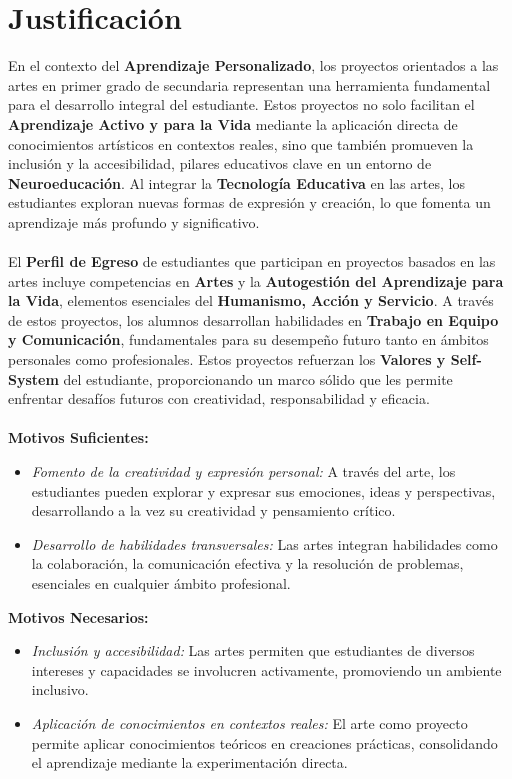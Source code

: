 \section{Justificación}
En el contexto del \textbf{Aprendizaje Personalizado}, los proyectos orientados a las artes en primer grado de secundaria representan una herramienta fundamental para el desarrollo integral del estudiante. Estos proyectos no solo facilitan el \textbf{Aprendizaje Activo y para la Vida} mediante la aplicación directa de conocimientos artísticos en contextos reales, sino que también promueven la inclusión y la accesibilidad, pilares educativos clave en un entorno de \textbf{Neuroeducación}. Al integrar la \textbf{Tecnología Educativa} en las artes, los estudiantes exploran nuevas formas de expresión y creación, lo que fomenta un aprendizaje más profundo y significativo.
\\ \\ 
El \textbf{Perfil de Egreso} de estudiantes que participan en proyectos basados en las artes incluye competencias en \textbf{Artes} y la \textbf{Autogestión del Aprendizaje para la Vida}, elementos esenciales del \textbf{Humanismo, Acción y Servicio}. A través de estos proyectos, los alumnos desarrollan habilidades en \textbf{Trabajo en Equipo y Comunicación}, fundamentales para su desempeño futuro tanto en ámbitos personales como profesionales. Estos proyectos refuerzan los \textbf{Valores y Self-System} del estudiante, proporcionando un marco sólido que les permite enfrentar desafíos futuros con creatividad, responsabilidad y eficacia.
\\ \\ 
\textbf{Motivos Suficientes:} \\
\begin{itemize}
    \item \textit{Fomento de la creatividad y expresión personal:}
    A través del arte, los estudiantes pueden explorar y expresar sus emociones, ideas y perspectivas, desarrollando a la vez su creatividad y pensamiento crítico.
    \item \textit{Desarrollo de habilidades transversales:}
    Las artes integran habilidades como la colaboración, la comunicación efectiva y la resolución de problemas, esenciales en cualquier ámbito profesional.
\end{itemize}
\textbf{Motivos Necesarios:}
\begin{itemize}
    \item \textit{Inclusión y accesibilidad:}
     Las artes permiten que estudiantes de diversos intereses y capacidades se involucren activamente, promoviendo un ambiente inclusivo.
     \item \textit{Aplicación de conocimientos en contextos reales:}
    El arte como proyecto permite aplicar conocimientos teóricos en creaciones prácticas, consolidando el aprendizaje mediante la experimentación directa.
\end{itemize}
\newpage
